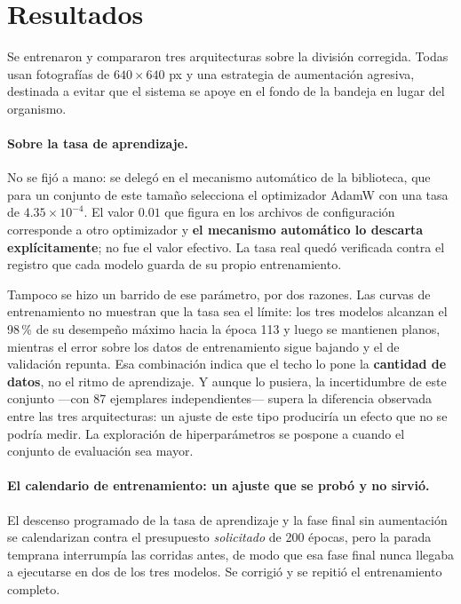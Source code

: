 \documentclass[onecolumn]{article}
\begin{document}
\section{Resultados}

Se entrenaron y compararon tres arquitecturas sobre la división corregida. Todas usan fotografías de $640\times640$ px y una estrategia de aumentación agresiva, destinada a evitar que el sistema se apoye en el fondo de la bandeja en lugar del organismo.

\paragraph{Sobre la tasa de aprendizaje.} No se fijó a mano: se delegó en el mecanismo automático de la biblioteca, que para un conjunto de este tamaño selecciona el optimizador AdamW con una tasa de $4.35\times10^{-4}$. El valor $0.01$ que figura en los archivos de configuración corresponde a otro optimizador y \textbf{el mecanismo automático lo descarta explícitamente}; no fue el valor efectivo. La tasa real quedó verificada contra el registro que cada modelo guarda de su propio entrenamiento.

Tampoco se hizo un barrido de ese parámetro, por dos razones. Las curvas de entrenamiento no muestran que la tasa sea el límite: los tres modelos alcanzan el 98\,\% de su desempeño máximo hacia la época 113 y luego se mantienen planos, mientras el error sobre los datos de entrenamiento sigue bajando y el de validación repunta. Esa combinación indica que el techo lo pone la \textbf{cantidad de datos}, no el ritmo de aprendizaje. Y aunque lo pusiera, la incertidumbre de este conjunto ---con 87 ejemplares independientes--- supera la diferencia observada entre las tres arquitecturas: un ajuste de este tipo produciría un efecto que no se podría medir. La exploración de hiperparámetros se pospone a cuando el conjunto de evaluación sea mayor.

\paragraph{El calendario de entrenamiento: un ajuste que se probó y no sirvió.} El descenso programado de la tasa de aprendizaje y la fase final sin aumentación se calendarizan contra el presupuesto \emph{solicitado} de 200 épocas, pero la parada temprana interrumpía las corridas antes, de modo que esa fase final nunca llegaba a ejecutarse en dos de los tres modelos. Se corrigió y se repitió el entrenamiento completo.
\end{document}
